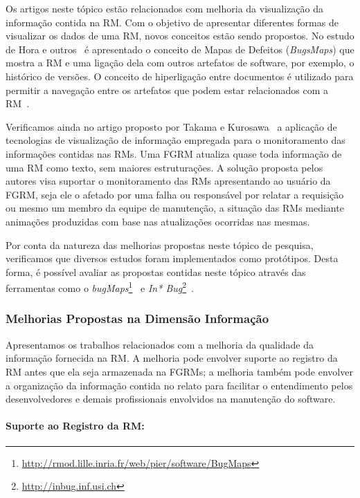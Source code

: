 Os artigos neste tópico estão relacionados com melhoria da visualização da
informação contida na RM\@. Com o objetivo de apresentar diferentes formas de
visualizar os dados de uma RM, novos conceitos estão sendo propostos. No estudo
de Hora e outros~\cite{hora2012bug} é apresentado o conceito de Mapas de
Defeitos (\textit{BugsMaps}) que mostra a RM e uma ligação dela com outros
artefatos de software, por exemplo, o histórico de versões. O conceito de
hiperligação entre documentos é utilizado para permitir a navegação entre os
artefatos que podem estar relacionados com a RM~\cite{dal2014bug}.

Verificamos ainda no artigo proposto por Takama e
Kurosawa~\cite{takama2013application} a aplicação de tecnologias de
visualização de informação empregada para o monitoramento das informações
contidas nas RMs. Uma FGRM atualiza quase toda informação de uma RM como texto,
sem maiores estruturações. A solução proposta pelos autores visa suportar o
monitoramento das RMs apresentando ao usuário da FGRM, seja ele o afetado por
uma falha ou responsável por relatar a requisição ou mesmo um membro da equipe
de manutenção, a situação das RMs mediante animações produzidas com base nas
atualizações ocorridas nas mesmas.

Por conta da natureza das melhorias propostas neste tópico de pesquisa,
verificamos que diversos estudos foram implementados como protótipos. Desta
forma, é possível avaliar as propostas contidas neste tópico através das
ferramentas como o
\textit{bugMaps}\footnote{\url{http://rmod.lille.inria.fr/web/pier/software/BugMaps}}~\cite{hora2012bug}
e \textit{In* Bug}\footnote{\url{http://inbug.inf.usi.ch}}~\cite{dal2014bug}.

\subsubsection{Melhorias Propostas na Dimensão Informação}\label{ssub:melhorias_dim_informacao}

Apresentamos os trabalhos relacionados com a melhoria da qualidade da
informação fornecida na RM\@. A melhoria pode envolver suporte ao registro da
RM antes que ela seja armazenada na FGRMs; a melhoria também pode envolver a
organização da informação contida no relato para facilitar o entendimento pelos
desenvolvedores e demais profissionais envolvidos na manutenção do software.

\paragraph{Suporte ao Registro da RM:}


